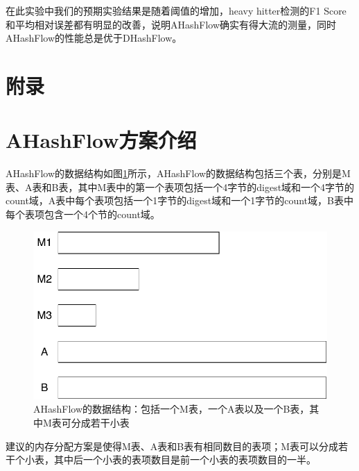 \documentclass{article}
\begin{document}
在此实验中我们的预期实验结果是随着阈值的增加，heavy hitter检测的F1 Score和平均相对误差都有明显的改善，说明AHashFlow确实有得大流的测量，同时AHashFlow的性能总是优于DHashFlow。

\appendix
\section*{附录}
\section{AHashFlow方案介绍}
AHashFlow的数据结构如图\ref{fig:ahashflow}所示，AHashFlow的数据结构包括三个表，分别是M表、A表和B表，其中M表中的第一个表项包括一个4字节的digest域和一个4字节的count域，A表中每个表项包括一个1字节的digest域和一个1字节的count域，B表中每个表项包含一个4个节的count域。
\begin{figure}[ht!]
	\centering
	\includegraphics[width=0.7\linewidth]{./figures/AHashFlowDataStructure/AHashFlow}
	\caption{AHashFlow的数据结构：包括一个M表，一个A表以及一个B表，其中M表可分成若干小表}
	\label{fig:ahashflow}
\end{figure}

建议的内存分配方案是使得M表、A表和B表有相同数目的表项；M表可以分成若干个小表，其中后一个小表的表项数目是前一个小表的表项数目的一半。



\begin{algorithm}[ht!]
	\caption{$promote(idx, digest, cnt)$}
	\label{alg: promote}
	\begin{algorithmic}[1]
	\end{algorithmic}
\end{algorithm}

\begin{algorithm}[ht!]
	\caption{$reset(idx)$}
	\label{alg: reset}
	\begin{algorithmic}[1]
	\end{algorithmic}
\end{algorithm}
\end{document}
